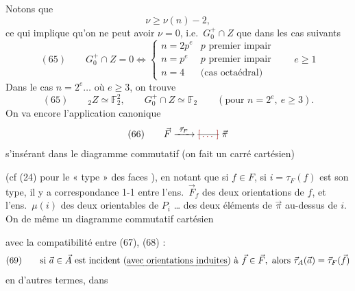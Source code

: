 \documentclass[11pt,a4paper]{article}
\begin{document}
Notons que
\[
\nu \geqslant \nu(n) - 2 ,
\]
ce qui implique qu'on ne peut avoir $\nu = 0$, i.e.\ $G_0^{+} \cap Z$ que dans les cas suivants 
\[
(65) \qquad G_0^{+} \cap Z = 0 \iff \begin{cases} n = 2p^{e} & p \text{ premier impair} \\ n = p^{e} & p \text{ premier impair} \\ n = 4 & \text{(cas octaédral)} \end{cases} \qquad e \geqslant 1
\]
 Dans le cas $n = 2^{e} \ldots$ où $e \geqslant 3$, on trouve 
\[
(65) \qquad {}_2 Z \simeq \mathbb{F}_2^{2}, \qquad G_0^{+} \cap Z \simeq \mathbb{F}_2 \qquad (\text{pour } n = 2^{e},\ e \geqslant 3).
\]
On va encore   l'application canonique
\[
(66) \qquad \vec{F} \xrightarrow{\ \vec{\tau}_F\ } \text{\struck{\ill{}}}\ \vec{\pi}
\]
s'insérant dans le diagramme commutatif (on fait un carré cartésien)


(cf (24) pour le « type » des faces ), en notant que si $f \in F$, si $i = \tau_F(f)$ est son type, il y a correspondance 1-1 entre l'ens.\ $\vec{F}_f$ des deux orientations de $f$, et l'ens.\ $\mu(i)$ des deux orientables de $P_i$ … des deux éléments de $\vec{\pi}$ au-dessus de $i$. On  de même un diagramme commutatif cartésien



avec la compatibilité entre (67), (68) :
\[
(69) \qquad \text{si } \vec{a} \in \vec{A} \text{ est incident (\emph{avec orientations induites}) à } \vec{f} \in \vec{F}, \text{ alors } \vec{\tau}_A(\vec{a}) = \vec{\tau}_F(\vec{f})
\]
  \ill{}  en d'autres termes, dans
\end{document}
